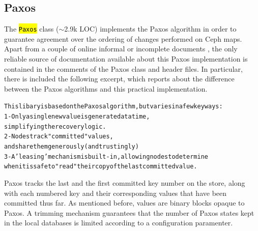 \documentclass{article}
\newcommand{\hlc}[2][yellow]{\sethlcolor{#1}\hl{#2}}
\renewcommand{\c}[1]{\xspace{\small\hlc[light-gray]{\texttt{#1}}}\xspace}
\begin{document}
\subsection{Paxos}
The \c{Paxos} class ($\sim$2.9k LOC) implements the Paxos algorithm in order 
to guarantee agreement over the ordering of changes performed on Ceph maps.
Apart from a couple of online informal or incomplete documents \cite{ceph-paxos1,ceph-paxos2}, 
the only reliable source of documentation available about this Paxos implementation is contained
in the comments of the Paxos class and header files.
In particular, there is included the following excerpt, which reports about the difference between the Paxos algorithms
and this practical implementation.

\begin{alltt}
\small
This libary is based on the Paxos algorithm, but varies in a few key ways:
 1- Only a single new value is generated at a time, 
    simplifying the recovery logic.
 2- Nodes track "committed" values, 
    and share them generously (and trustingly)
 3- A 'leasing' mechanism is built-in, allowing nodes to determine 
    when it is safe to "read" their copy of the last committed value.
\end{alltt}

Paxos tracks the last and the first committed key number on the store, along with each numbered key and their 
corresponding values that have been committed thus far.
As mentioned before, values are binary blocks opaque to Paxos.
A trimming mechanism guarantees that the number of Paxos states kept in the local databases is limited
according to a configuration paramenter.
\end{document}
